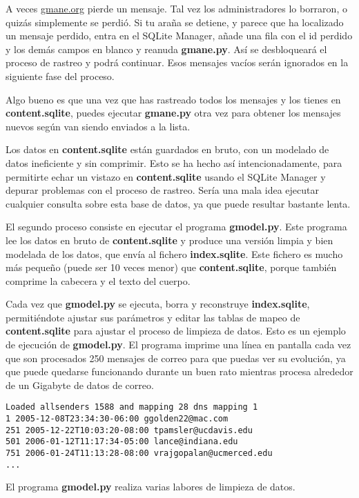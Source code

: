 A veces \url{gmane.org} pierde un mensaje. Tal vez los administradores lo borraron,
o quizás simplemente se perdió. Si tu araña se detiene, y parece que ha localizado
un mensaje perdido, entra en el SQLite Manager, añade una fila con el id perdido y los
demás campos en blanco y reanuda {\bf gmane.py}. Así se desbloqueará el
proceso de rastreo y podrá continuar. Esos mensajes vacíos serán ignorados en la siguiente
fase del proceso.

Algo bueno es que una vez que has rastreado todos los mensajes y los tienes en
{\bf content.sqlite}, puedes ejecutar {\bf gmane.py} otra vez para obtener los mensajes
nuevos según van siendo enviados a la lista.

Los datos en {\bf content.sqlite} están guardados en bruto, con un modelado de datos
ineficiente y sin comprimir.
Esto se ha hecho así intencionadamente, para permitirte echar un vistazo en {\bf content.sqlite}
usando el SQLite Manager y depurar problemas con el proceso de rastreo.
Sería una mala idea ejecutar cualquier consulta sobre esta base de datos, ya que
puede resultar bastante lenta.

El segundo proceso consiste en ejecutar el programa {\bf gmodel.py}. Este programa lee los datos
en bruto de {\bf content.sqlite} y produce una versión limpia y bien modelada de los datos,
que envía al fichero {\bf index.sqlite}. Este fichero es mucho más pequeño (puede ser 10 veces
menor) que {\bf content.sqlite}, porque también comprime la cabecera y el texto del cuerpo.

Cada vez que {\bf gmodel.py} se ejecuta, borra y reconstruye {\bf index.sqlite}, permitiéndote
ajustar sus parámetros y editar las tablas de mapeo de {\bf content.sqlite} para ajustar el
proceso de limpieza de datos. Esto es un ejemplo de ejecución de {\bf gmodel.py}. El programa imprime
una línea en pantalla cada vez que son procesados 250 mensajes de correo para que puedas ver su
evolución, ya que puede quedarse funcionando durante un buen rato mientras procesa alrededor de
un Gigabyte de datos de correo.

\beforeverb
\begin{verbatim}
Loaded allsenders 1588 and mapping 28 dns mapping 1
1 2005-12-08T23:34:30-06:00 ggolden22@mac.com
251 2005-12-22T10:03:20-08:00 tpamsler@ucdavis.edu
501 2006-01-12T11:17:34-05:00 lance@indiana.edu
751 2006-01-24T11:13:28-08:00 vrajgopalan@ucmerced.edu
...
\end{verbatim}
\afterverb
%
El programa {\bf gmodel.py} realiza varias labores de limpieza de datos.

